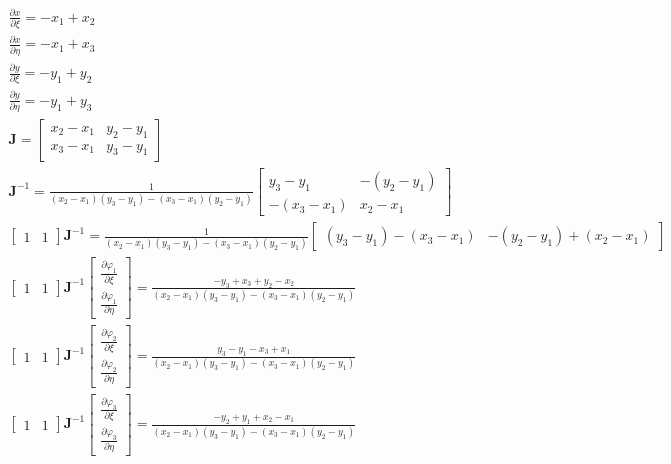 \documentclass{article}
\begin{document}
\begin{equation}\label{eq:SF_t}
    \begin{gathered}
        \frac{\partial x}{\partial \xi}=-x_1+x_2\\
        \frac{\partial x}{\partial \eta}=-x_1+x_3\\
        \frac{\partial y}{\partial \xi}=-y_1+y_2\\
        \frac{\partial y}{\partial \eta}=-y_1+y_3\\
        \textbf{J}=\begin{bmatrix}
            x_2-x_1&y_2-y_1 \\
            x_3-x_1&y_3-y_1
        \end{bmatrix}\\
        \textbf{J}^{-1}= \frac{1}{(x_2-x_1)(y_3-y_1) - (x_3-x_1)(y_2-y_1)} \begin{bmatrix}
y_3-y_1 & -(y_2-y_1) \\
-(x_3-x_1) & x_2-x_1
\end{bmatrix}\\
\begin{bmatrix}
    1 & 1
\end{bmatrix}\textbf{J}^{-1}=\frac{1}{(x_2-x_1)(y_3-y_1) - (x_3-x_1)(y_2-y_1)}\begin{bmatrix} (y_3-y_1) - (x_3-x_1) & -(y_2-y_1) + (x_2-x_1) \end{bmatrix}\\
\begin{bmatrix}
    1 & 1
\end{bmatrix}\textbf{J}^{-1}\begin{bmatrix}
            \frac{\partial \varphi_1}{\partial \xi}\\
            \frac{\partial \varphi_1}{\partial \eta}
        \end{bmatrix} =\frac{  - y_3 + x_3 + y_2 - x_2}{(x_2-x_1)(y_3-y_1) - (x_3-x_1)(y_2-y_1)}\\
        \begin{bmatrix}
    1 & 1
\end{bmatrix}\textbf{J}^{-1}\begin{bmatrix}
            \frac{\partial \varphi_2}{\partial \xi}\\
            \frac{\partial \varphi_2}{\partial \eta}
        \end{bmatrix} =\frac{ y_3 - y_1 - x_3 + x_1}{(x_2-x_1)(y_3-y_1) - (x_3-x_1)(y_2-y_1)}\\
        \begin{bmatrix}
    1 & 1
\end{bmatrix}\textbf{J}^{-1}\begin{bmatrix}
            \frac{\partial \varphi_3}{\partial \xi}\\
            \frac{\partial \varphi_3}{\partial \eta}
        \end{bmatrix} =\frac{ -y_2 + y_1 + x_2 - x_1}{(x_2-x_1)(y_3-y_1) - (x_3-x_1)(y_2-y_1)}
    \end{gathered}
\end{equation}
\end{document}
